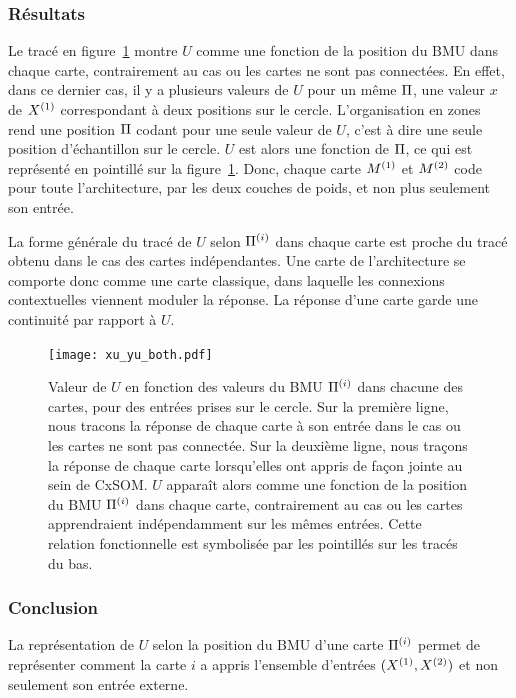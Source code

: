 \subsubsection{Résultats}

Le tracé en figure~\ref{fig:piu} montre $U$ comme une fonction de la position du BMU dans chaque carte, contrairement au cas ou les cartes ne sont pas connectées. 
En effet, dans ce dernier cas, il y a plusieurs valeurs de $U$ pour un même $\Pi$, une valeur $x$ de $X^{({1})}$ correspondant à deux positions sur le cercle.
L'organisation en zones rend une position $\Pi$ codant pour une seule valeur de $U$, c'est à dire une seule position d'échantillon sur le cercle. $U$ est alors une fonction de $\Pi$, ce qui est représenté en pointillé sur la figure~\ref{fig:piu}. Donc, chaque carte $M^{({1})}$ et $M^{({2})}$ code pour toute l'architecture, par les deux couches de poids, et non plus seulement son entrée.

La forme générale du tracé de $U$ selon $\Pi^{({i})}$ dans chaque carte est proche du tracé obtenu dans le cas des cartes indépendantes. Une carte de l'architecture se comporte donc comme une carte classique, dans laquelle les connexions contextuelles viennent moduler la réponse. La réponse d'une carte garde une continuité par rapport à $U$.
\begin{figure}
\centering
\texttt{[image: xu\_yu\_both.pdf]}
\caption{Valeur de $U$ en fonction des valeurs du BMU $\Pi^{({i})}$ dans chacune des cartes, pour des entrées prises sur le cercle. Sur la première ligne, nous tracons la réponse de chaque carte à son entrée dans le cas ou les cartes ne sont pas connectée. Sur la deuxième ligne, nous traçons la réponse de chaque carte lorsqu'elles ont appris de façon jointe au sein de CxSOM.
$U$ apparaît alors comme une fonction de la position du BMU $\Pi^{({i})}$ dans chaque carte, contrairement au cas ou les cartes apprendraient indépendamment sur les mêmes entrées. Cette relation fonctionnelle est symbolisée par les pointillés sur les tracés du bas.}
\label{fig:piu}
\end{figure}

\subsubsection{Conclusion}
La représentation de $U$ selon la position du BMU d'une carte $\Pi^{({i})}$ permet de représenter comment la carte $i$ a appris l'ensemble d'entrées $(X^{({1})},X^{({2})})$ et non seulement son entrée externe.

